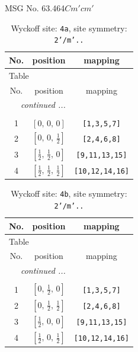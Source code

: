 \documentclass[fleqn,8pt]{jsarticle}
\begin{document}
\setcounter{MaxMatrixCols}{32}

\renewcommand{\tablename}{Table~}
\renewcommand{\figurename}{Figure~}
\begin{center}
\LARGE
MSG No. 63.464\quad$Cm'cm'$
\end{center}
\renewcommand{\arraystretch}{1.2}
\begin{longtable}{ccc}
\caption{Wyckoff site: {\tt 4a}, site symmetry: {\tt 2'/m'..}}
 \\
 \hline \hline
No. & position & mapping \\ \hline \endfirsthead

\multicolumn{2}{l}{\tablename\ \thetable{}} \\
 \hline \hline
No. & position & mapping \\ \hline \endhead

 \hline \hline
\multicolumn{2}{r}{\footnotesize\it continued ...} \\ \endfoot

 \hline \hline
\multicolumn{2}{r}{} \\ \endlastfoot

1 & $\left[ 0,\, 0,\, 0 \right]$ & {\tt [1,3,5,7]} \\ \hline
2 & $\left[ 0,\, 0,\, \frac{1}{2} \right]$ & {\tt [2,4,6,8]} \\ \hline
3 & $\left[ \frac{1}{2},\, \frac{1}{2},\, 0 \right]$ & {\tt [9,11,13,15]} \\ \hline
4 & $\left[ \frac{1}{2},\, \frac{1}{2},\, \frac{1}{2} \right]$ & {\tt [10,12,14,16]} \\
\end{longtable}
\renewcommand{\arraystretch}{1.2}
\begin{longtable}{ccc}
\caption{Wyckoff site: {\tt 4b}, site symmetry: {\tt 2'/m'..}}
 \\
 \hline \hline
No. & position & mapping \\ \hline \endfirsthead

\multicolumn{2}{l}{\tablename\ \thetable{}} \\
 \hline \hline
No. & position & mapping \\ \hline \endhead

 \hline \hline
\multicolumn{2}{r}{\footnotesize\it continued ...} \\ \endfoot

 \hline \hline
\multicolumn{2}{r}{} \\ \endlastfoot

1 & $\left[ 0,\, \frac{1}{2},\, 0 \right]$ & {\tt [1,3,5,7]} \\ \hline
2 & $\left[ 0,\, \frac{1}{2},\, \frac{1}{2} \right]$ & {\tt [2,4,6,8]} \\ \hline
3 & $\left[ \frac{1}{2},\, 0,\, 0 \right]$ & {\tt [9,11,13,15]} \\ \hline
4 & $\left[ \frac{1}{2},\, 0,\, \frac{1}{2} \right]$ & {\tt [10,12,14,16]} \\
\end{longtable}
\end{document}
